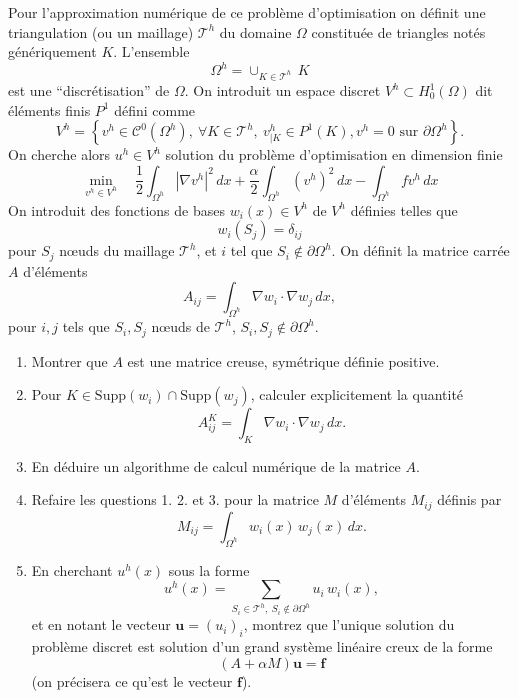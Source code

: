 \documentclass[11pt, a4paper]{article}
\begin{document}
Pour l'approximation numérique de ce problème d'optimisation on définit une triangulation (ou un maillage)
$\mathscr{T}^h$ du domaine $\Omega$ constituée de triangles notés génériquement $K$.
L'ensemble
\[
\Omega^h = \displaystyle{\cup_{K\in\mathscr{T}^h}\, K}
\]
est une ``discrétisation'' de $\Omega$. On introduit un espace discret $V^h \subset H^1_0(\Omega)$ dit éléments finis $P^1$ défini comme
\[
V^h = \left\{ v^h\in \mathscr{C}^0(\Omega^h),\ \forall K \in \mathscr{T}^h,  \ v^h_{|K}\in P^1(K),
v^h=0 \mbox{ sur } \partial\Omega^h \right\}.
\]
On cherche alors $u^h\in V^h$ solution du problème d'optimisation en dimension finie
\[
\min_{v^h\in V^h}\quad \frac{1}{2}\int_{\Omega^h} |\nabla v^h|^2\, dx
+ \dfrac{\alpha}{2} \int_{\Omega^h} (v^h)^2\, dx - \int_{\Omega^h} f v^h\, dx
\]
On introduit des fonctions de bases $w_i(x)\in V^h$ de $V^h$ définies telles que
\[
w_i(S_j) = \delta_{ij}
\]
pour $S_j$ n\oe uds du maillage $\mathscr{T}^h$, et $i$ tel que $S_i\notin \partial\Omega^h$. On définit la matrice carrée $A$ d'éléments
\[
A_{ij} = \int_{\Omega^h} \nabla w_i\cdot\nabla w_j\, dx,
\]
pour $i,j$ tels que $S_i,S_j$ n\oe uds de $\mathscr{T}^h$, $S_i,S_j\notin \partial\Omega^h$. 
\begin{enumerate}
\item Montrer que $A$ est une matrice creuse, symétrique définie positive.
\item Pour $K\in \text{Supp}(w_i)\cap\text{Supp}(w_j)$, calculer explicitement la
quantité
\[
A_{ij}^K = \int_K \nabla w_i\cdot \nabla w_j\, dx.
\]
\item En déduire un algorithme de calcul numérique de la matrice $A$.
\item Refaire les questions 1. 2. et 3. pour la matrice $M$ d'éléments $M_{ij}$ définis par
\[
M_{ij} = \int_{\Omega^h} w_i(x)\, w_j(x)\, dx.
\]
\item En cherchant $u^h(x)$ sous la forme
\[
u^h(x) = \sum_{S_i\in\mathscr{T}^h,\ S_i\notin \partial\Omega^h} u_i \, w_i(x),
\]
et en notant le vecteur $\bm{u}=(u_i)_i$, montrez que l'unique solution du problème discret
est solution d'un grand système linéaire creux de la forme
\[
(A+\alpha M)\bm{u} = \bm{f}
\]
(on précisera ce qu'est le vecteur $\bm{f}$).
\end{enumerate}
%
\end{document}
